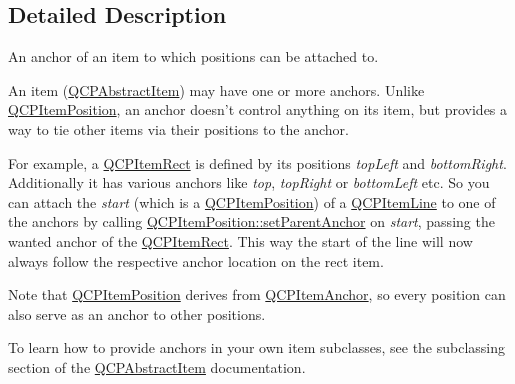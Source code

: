 \subsection{\-Detailed \-Description}
\-An anchor of an item to which positions can be attached to. 

\-An item (\hyperlink{classQCPAbstractItem}{\-Q\-C\-P\-Abstract\-Item}) may have one or more anchors. \-Unlike \hyperlink{classQCPItemPosition}{\-Q\-C\-P\-Item\-Position}, an anchor doesn't control anything on its item, but provides a way to tie other items via their positions to the anchor.

\-For example, a \hyperlink{classQCPItemRect}{\-Q\-C\-P\-Item\-Rect} is defined by its positions {\itshape top\-Left\/} and {\itshape bottom\-Right\/}. \-Additionally it has various anchors like {\itshape top\/}, {\itshape top\-Right\/} or {\itshape bottom\-Left\/} etc. \-So you can attach the {\itshape start\/} (which is a \hyperlink{classQCPItemPosition}{\-Q\-C\-P\-Item\-Position}) of a \hyperlink{classQCPItemLine}{\-Q\-C\-P\-Item\-Line} to one of the anchors by calling \hyperlink{classQCPItemPosition_ac094d67a95d2dceafa0d50b9db3a7e51}{\-Q\-C\-P\-Item\-Position\-::set\-Parent\-Anchor} on {\itshape start\/}, passing the wanted anchor of the \hyperlink{classQCPItemRect}{\-Q\-C\-P\-Item\-Rect}. \-This way the start of the line will now always follow the respective anchor location on the rect item.

\-Note that \hyperlink{classQCPItemPosition}{\-Q\-C\-P\-Item\-Position} derives from \hyperlink{classQCPItemAnchor}{\-Q\-C\-P\-Item\-Anchor}, so every position can also serve as an anchor to other positions.

\-To learn how to provide anchors in your own item subclasses, see the subclassing section of the \hyperlink{classQCPAbstractItem}{\-Q\-C\-P\-Abstract\-Item} documentation. 

